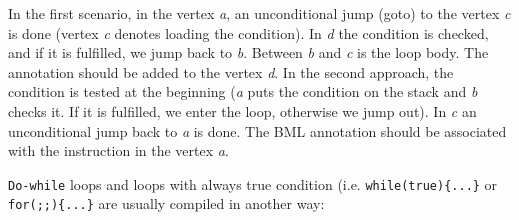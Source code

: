 \documentclass{acm_proc_article-sp}
\begin{document}
\begin{figure}[h]
\end{figure}
In the first scenario, in the vertex \textit{a}, an unconditional jump (goto) to the vertex \textit{c} is done (vertex \textit{c} denotes loading the condition). In \textit{d} the condition is checked, and if it is fulfilled, we jump back to \textit{b}. Between \textit{b} and \textit{c} is the loop body. The annotation should be added to the vertex \textit{d}. In the second approach, the condition is tested at the beginning (\textit{a} puts the condition on the stack and \textit{b} checks it. If it is fulfilled, we enter the loop, otherwise we jump out). In \textit{c} an unconditional jump back to \textit{a} is done. The BML annotation should be associated with the instruction in the vertex \textit{a}.

\texttt{Do-while} loops and loops with always true condition (i.e. \texttt{while(true)\{...\}} or \texttt{for(;;)\{...\}} are usually compiled in another way:
\end{document}
